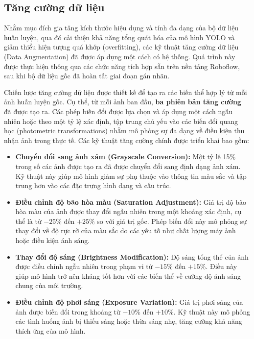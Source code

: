 \subsection{Tăng cường dữ liệu}
\label{subsec:data_augmentation_specific_v3}

Nhằm mục đích gia tăng kích thước hiệu dụng và tính đa dạng của bộ dữ liệu huấn luyện, qua đó cải thiện khả năng tổng quát hóa của mô hình YOLO và giảm thiểu hiện tượng quá khớp (overfitting), các kỹ thuật tăng cường dữ liệu (Data Augmentation) đã được áp dụng một cách có hệ thống. Quá trình này được thực hiện thông qua các chức năng tích hợp sẵn trên nền tảng Roboflow, sau khi bộ dữ liệu gốc đã hoàn tất giai đoạn gán nhãn.

Chiến lược tăng cường dữ liệu được thiết kế để tạo ra các biến thể hợp lý từ mỗi ảnh huấn luyện gốc. Cụ thể, từ mỗi ảnh ban đầu, \textbf{ba phiên bản tăng cường} đã được tạo ra. Các phép biến đổi được lựa chọn và áp dụng một cách ngẫu nhiên hoặc theo một tỷ lệ xác định, tập trung chủ yếu vào các biến đổi quang học (photometric transformations) nhằm mô phỏng sự đa dạng về điều kiện thu nhận ảnh trong thực tế. Các kỹ thuật tăng cường chính được triển khai bao gồm:

\begin{itemize}
    \item \textbf{Chuyển đổi sang ảnh xám (Grayscale Conversion):} Một tỷ lệ 15\% trong số các ảnh được tạo ra đã được chuyển đổi sang định dạng ảnh xám. Kỹ thuật này giúp mô hình giảm sự phụ thuộc vào thông tin màu sắc và tập trung hơn vào các đặc trưng hình dạng và cấu trúc.
    \item \textbf{Điều chỉnh độ bão hòa màu (Saturation Adjustment):} Giá trị độ bão hòa màu của ảnh được thay đổi ngẫu nhiên trong một khoảng xác định, cụ thể là từ $-25\%$ đến $+25\%$ so với giá trị gốc. Phép biến đổi này mô phỏng sự thay đổi về độ rực rỡ của màu sắc do các yếu tố như chất lượng máy ảnh hoặc điều kiện ánh sáng.
    \item \textbf{Thay đổi độ sáng (Brightness Modification):} Độ sáng tổng thể của ảnh được điều chỉnh ngẫu nhiên trong phạm vi từ $-15\%$ đến $+15\%$. Điều này giúp mô hình trở nên kháng tốt hơn với các biến thể về cường độ ánh sáng chung của môi trường.
    \item \textbf{Điều chỉnh độ phơi sáng (Exposure Variation):} Giá trị phơi sáng của ảnh được biến đổi trong khoảng từ $-10\%$ đến $+10\%$. Kỹ thuật này mô phỏng các tình huống ảnh bị thiếu sáng hoặc thừa sáng nhẹ, tăng cường khả năng thích ứng của mô hình.
\end{itemize}

